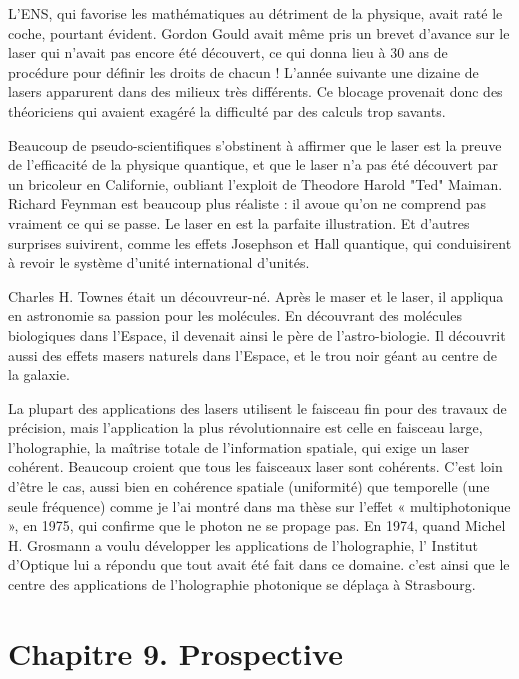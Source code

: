 \documentclass[a4paper,12pt]{article}
\begin{document}
L'ENS, qui favorise les mathématiques au détriment de la physique, avait raté le coche, pourtant évident. Gordon Gould avait même pris un brevet d'avance sur le laser qui n'avait pas encore été découvert, ce qui donna lieu à 30 ans de procédure pour définir les droits de chacun ! L'année suivante une dizaine de lasers apparurent dans des milieux très différents. Ce blocage provenait donc des théoriciens qui avaient exagéré la difficulté par des calculs trop savants.

Beaucoup de pseudo-scientifiques s'obstinent à affirmer que le laser est la preuve de l'efficacité de la physique quantique, et que le laser n'a pas été découvert par un bricoleur en Californie, oubliant l'exploit de Theodore Harold "Ted" Maiman. Richard Feynman est beaucoup plus réaliste : il avoue qu'on ne comprend pas vraiment ce qui se passe. Le laser en est la parfaite illustration. Et d'autres surprises suivirent, comme les effets Josephson et Hall quantique, qui conduisirent à revoir le système d'unité international d'unités.

Charles H. Townes était un découvreur-né. Après le maser et le laser, il appliqua en astronomie sa passion pour les molécules. En découvrant des molécules biologiques dans l'Espace, il devenait ainsi le père de l'astro-biologie. Il découvrit aussi des effets masers naturels dans l'Espace, et le trou noir géant au centre de la galaxie.    

La plupart des applications des lasers utilisent le faisceau fin pour des travaux de précision, mais l'application la plus révolutionnaire est celle en faisceau large, l'holographie, la maîtrise totale de l'information spatiale, qui exige un laser cohérent. Beaucoup croient que tous les faisceaux laser sont cohérents. C'est loin d'être le cas, aussi bien en cohérence spatiale (uniformité) que temporelle (une seule fréquence) comme je l'ai montré dans ma thèse sur l'effet « multiphotonique », en 1975, qui confirme que le photon ne se propage pas. En 1974, quand Michel H. Grosmann a voulu développer les applications de l'holographie, l' Institut d'Optique lui a répondu que tout avait été fait dans ce domaine. c'est ainsi que le centre des applications de l'holographie photonique se déplaça à Strasbourg.







\section{Chapitre 9. Prospective}
\end{document}
